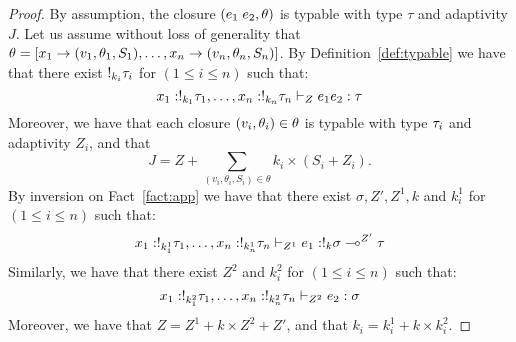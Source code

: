 \begin{proof}
   By assumption, the closure $(e_1 \; e_2 , \theta)$ is
   typable with type $\tau$ and adaptivity $J$.  Let us assume without
   loss of generality that
   $\theta=[x_1 \to (v_1 , \theta_1 ,
   S_1 ) , \ldots, x_n \to (v_n, \theta_n, S_n )]$.  By
   Definition~\ref{def:typable} we have that there exist 
   $!_{k_i} \tau_i$ for $(1\leq i\leq n)$ such that:
     \begin{equation}
\label{fact:app}
       x_1 : !_{k_1} \tau_1, \ldots, x_n:!_{k_n} \tau_n
       \vdash_{Z} e_1e_2 : \tau 
\end{equation}
    Moreover, we have that each closure $ (v_i, \theta_i)\in\theta $ is
    typable with type $\tau_i$ and adaptivity $Z_i$, and that 
$$J = Z + \sum_{(v_i,\theta_i,S_i)\in\theta} k_i \times (S_i
  +Z_i).$$
By inversion on Fact~\ref{fact:app} we have that there exist
$\sigma,Z',Z^1, k$ and $k_i^1$ for $(1\leq i\leq n)$ such that:
\begin{equation}
\label{fact:head}
 x_1 : !_{k_1^1} \tau_1, \ldots, x_n:!_{k_n^1} \tau_n
       \vdash_{Z^1} e_1 : !_{k} \sigma
      \multimap^{Z'} \tau
\end{equation}
Similarly, 
we have that there exist
$Z^2$ and $k_i^2$ for $(1\leq i\leq n)$ such that:
\begin{equation}
\label{fact:arg}
 x_1 : !_{k_1^2} \tau_1, \ldots, x_n:!_{k_n^2} \tau_n
       \vdash_{Z^2} e_2 : \sigma
\end{equation}
Moreover, we have that $Z=Z^1+k\times Z^2+Z'$, and that
$k_i=k_i^1+k\times k_i^2$.  


\end{proof}
